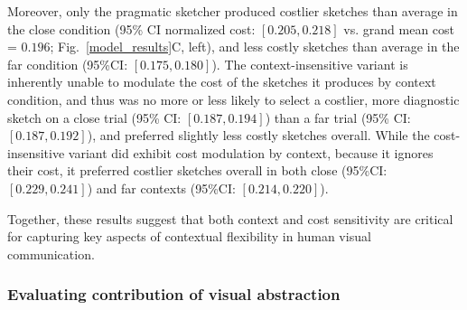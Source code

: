 \documentclass[9pt,twocolumn,twoside]{pnas-new}
\begin{document}
Moreover, only the pragmatic sketcher produced costlier sketches than average in the close condition (95\% CI normalized cost: $[0.205, 0.218]$ vs. grand mean cost = $0.196$; Fig.~\ref{model_results}C, left), and less costly sketches than average in the far condition (95\%CI: $[0.175, 0.180]$). 
The context-insensitive variant is inherently unable to modulate the cost of the sketches it produces by context condition, and thus was no more or less likely to select a costlier, more diagnostic sketch on a close trial (95\% CI: $[0.187, 0.194]$) than a far trial (95\% CI: $[0.187, 0.192]$), and preferred slightly less costly sketches overall. 
While the cost-insensitive variant did exhibit cost modulation by context, because it ignores their cost, it preferred costlier sketches overall in both close (95\%CI: $[0.229, 0.241]$) and far contexts (95\%CI: $[0.214, 0.220]$). 

Together, these results suggest that both context and cost sensitivity are critical for capturing key aspects of contextual flexibility in human visual communication. 

\subsubsection*{Evaluating contribution of visual abstraction}
\end{document}
